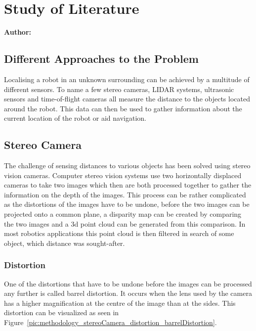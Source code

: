 \chapter{Study of Literature}

\textbf{Author: } 

\section{Different Approaches to the Problem}
Localising a robot in an unknown surrounding can be achieved by a multitude of different sensors. To name a few stereo cameras, LIDAR systems, ultrasonic sensors and time-of-flight cameras all measure the distance to the objects located around the robot. This data can then be used to gather information about the current location of the robot or aid navigation.

\section{Stereo Camera}
The challenge of sensing distances to various objects has been solved using stereo vision cameras. Computer stereo vision systems use two horizontally displaced cameras to take two images which then are both processed together to gather the information on the depth of the images. This process can be rather complicated as the distortions of the images have to be undone, before the two images can be projected onto a common plane, a disparity map can be created by comparing the two images and a 3d point cloud can be generated from this comparison. In most robotics applications this point cloud is then filtered in search of some object, which distance was sought-after.

\subsection{Distortion}
One of the distortions that have to be undone before the images can be processed any further is called barrel distortion. It occurs when the lens used by the camera has a higher magnification at the centre of the image than at the sides. This distortion can be visualized as seen in Figure~\ref{pic:methodology_stereoCamera_distortion_barrelDistortion}.

